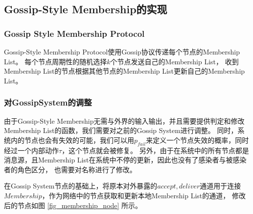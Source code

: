 \subsection{Gossip-Style Membership的实现}

\subsubsection{Gossip Style Membership Protocol}
Gossip-Style Membership Protocol使用Gossip协议传递每个节点的Membership List。
每个节点周期性的随机选择$k$个节点发送自己的Membership List，
收到Membership List的节点根据其他节点的Membership List更新自己的Membership List。

\subsubsection{对GossipSystem的调整}
由于Gossip-Style Membership无需与外界的输入输出，并且需要提供判定和修改Membership List的函数，我们需要对之前的Gossip System进行调整。
同时，系统内的节点也会有失效的可能，我们可以用$p_{fail}$来定义一个节点失效的概率，同时经过一个内部动作$\tau$，这个节点就会被修复。
另外，由于在系统中的所有节点都是消息源，且Membership List在系统中不停的更新，因此也没有了感染者与被感染者的角色区分，
也需要对名称进行了修改。

在Gossip System节点的基础上，将原本对外暴露的$accept,deliver$通道用于连接$Membership$，作为网络中的节点获取和更新本地Membership List的通道，
修改后的节点如图
\ref{fig_membership_node}
所示。

